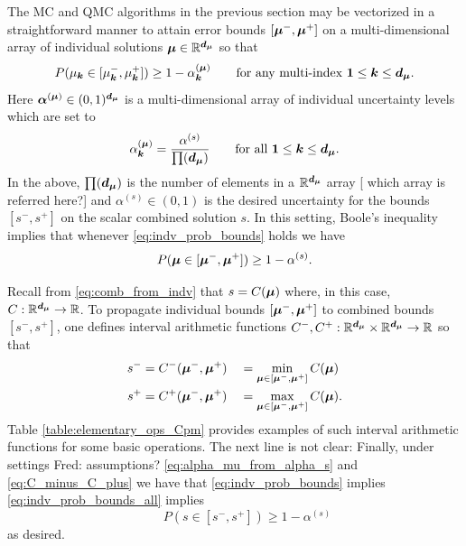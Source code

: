 \documentclass{article}[12pt]
\newcommand{\JRComment}[1]{{\color{violet}#1}}
\newcommand{\FJHComment}[1]{{\color{purple}Fred:  #1}}
\begin{document}
The MC and QMC algorithms in the previous section may be vectorized in a straightforward manner to attain error bounds $[\boldsymbol{\mu}^-,\boldsymbol{\mu}^+]$ on a multi-dimensional array of individual solutions $\boldsymbol{\mu} \in \mathbb{R}^{\boldsymbol{d}_{\boldsymbol{\mu}}}$ so that 
\begin{equation}
    P(\mu_{\boldsymbol{k}} \in [\mu_{\boldsymbol{k}}^-,\mu_{\boldsymbol{k}}^+]) \geq 1-\alpha_{\boldsymbol{k}}^{(\boldsymbol{\mu})}  \qquad \text{for any multi-index }\boldsymbol{1} \leq \boldsymbol{k} \leq \boldsymbol{d}_{\boldsymbol{\mu}}.
    \label{eq:indv_prob_bounds}
\end{equation}
Here $\boldsymbol{\alpha}^{(\boldsymbol{\mu})} \in (0,1)^{\boldsymbol{d}_{\boldsymbol{\mu}}}$ is a multi-dimensional array of individual uncertainty levels which are set to 
\begin{equation}
    \alpha_{\boldsymbol{k}}^{(\boldsymbol{\mu})} = \frac{\alpha^{(s)}}{\prod(\boldsymbol{d}_{\boldsymbol{\mu}})}
    \label{eq:alpha_mu_from_alpha_s} \qquad \text{for all }\boldsymbol{1} \leq \boldsymbol{k} \leq \boldsymbol{d}_{\boldsymbol{\mu}}.
\end{equation}
In the above, $\prod(\boldsymbol{d}_{\boldsymbol{\mu}})$ is the number of elements in a $\mathbb{R}^{\boldsymbol{d}_{\boldsymbol{\mu}}}$ array [ \JRComment{which array is referred here?}] and $\alpha^{(s)} \in (0,1)$ is the desired uncertainty for the bounds $[s^-,s^+]$ on the scalar combined solution $s$. In this setting, Boole's inequality \cite{boole1847mathematical} implies that whenever \eqref{eq:indv_prob_bounds} holds we have
\begin{equation}
    P(\boldsymbol{\mu} \in [\boldsymbol{\mu}^-,\boldsymbol{\mu}^+]) \geq 1-\alpha^{(s)}.
    \label{eq:indv_prob_bounds_all}
\end{equation} 

Recall from \eqref{eq:comb_from_indv} that $s = C(\boldsymbol{\mu})$ where, in this case, $C: \mathbb{R}^{\boldsymbol{d}_{\boldsymbol{\mu}}} \to \mathbb{R}$. To propagate individual bounds $[\boldsymbol{\mu}^-,\boldsymbol{\mu}^+]$ to combined bounds $[s^-,s^+]$, one defines interval arithmetic \cite{interval_analysis} functions $C^-,C^+: \mathbb{R}^{\boldsymbol{d}_{\boldsymbol{\mu}}} \times \mathbb{R}^{\boldsymbol{d}_{\boldsymbol{\mu}}} \to \mathbb{R}$ so that
\begin{equation}
    \begin{aligned}
    s^- &= C^-(\boldsymbol{\mu}^-,\boldsymbol{\mu}^+) &&= \min_{\boldsymbol{\mu} \in [\boldsymbol{\mu}^-,\boldsymbol{\mu}^+]} C(\boldsymbol{\mu}) \\
    s^+ &= C^+(\boldsymbol{\mu}^-,\boldsymbol{\mu}^+) &&= \max_{\boldsymbol{\mu} \in [\boldsymbol{\mu}^-,\boldsymbol{\mu}^+]} C(\boldsymbol{\mu}).
    \end{aligned}
    \label{eq:C_minus_C_plus}
\end{equation}
Table \ref{table:elementary_ops_Cpm} provides examples of such interval arithmetic functions for some basic operations. \JRComment{The next line is not clear:} Finally, under settings \FJHComment{assumptions?} \eqref{eq:alpha_mu_from_alpha_s} and \eqref{eq:C_minus_C_plus} we have that  \eqref{eq:indv_prob_bounds} implies \eqref{eq:indv_prob_bounds_all} implies
$$\qquad  P(s \in [s^-,s^+]) \geq 1-\alpha^{(s)}$$
as desired.
\end{document}
